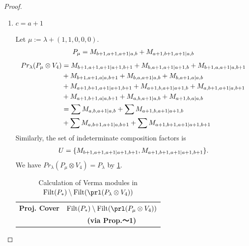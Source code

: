 \begin{proof}
\begin{enumerate}
\begin{enumerate}
        \item $c=a+1$ \par
        Let $\mu:=\lambda + (1,1,0,0,0) $.
        \begin{equation}\notag
          \begin{aligned}
            P_\mu = M_{b+1,a+1,a+1|a,b}
+ M_{a+1,b+1,a+1|a,b}
          \end{aligned}
        \end{equation}
        \begin{equation}\notag
          \begin{aligned}
            Pr_{\lambda}(P_\mu \otimes V_{4}) &=
M_{b+1,a+1,a+1|a+1,b+1}
+ M_{b,a+1,a+1|a+1,b}
+ M_{b+1,a,a+1|a,b+1}\\
                                              &
+ M_{b+1,a+1,a|a,b+1}
+ M_{b,a,a+1|a,b}
+ M_{b,a+1,a|a,b}\\
                                              &
+ M_{a+1,b+1,a+1|a+1,b+1}
+ M_{a+1,b,a+1|a+1,b}
+ M_{a,b+1,a+1|a,b+1}\\
                                              &
+ M_{a+1,b+1,a|a,b+1}
+ M_{a,b,a+1|a,b}
+ M_{a+1,b,a|a,b} \\
                                               &=
\sum M_{a,b,a+1|a,b}
+ \sum M_{a+1,b,a+1|a+1,b}\\
                                              &
+ \sum M_{a,b+1,a+1|a,b+1}
+ \sum M_{a+1,b+1,a+1|a+1,b+1}
          \end{aligned}
        \end{equation}
      Similarly, the set of indeterminate composition factors is 
\begin{equation}\notag
  \begin{aligned}
    U = \{
M_{b+1,a+1,a+1|a+1,b+1},
M_{a+1,b+1,a+1|a+1,b+1}
\}.
  \end{aligned}
\end{equation}
       We have $Pr_{\lambda}(P_\mu \otimes V_{4}) = P_\lambda  $ by \cref{tab:verma-analysis_c_12}.
\begin{table}[htbp]
\centering
\caption{Calculation of Verma modules in $\operatorname{Filt}(P_*) \setminus \operatorname{Filt}(\prl(P_\lambda \otimes V_{4})) $ } \label{tab:verma-analysis_c_12}
\begin{tabular}{cc}
\toprule
\textbf{Proj. Cover} & \textbf{$\operatorname{Filt}(P_*) \setminus \operatorname{Filt}(\prl(P_\mu \otimes V_{4})) $}  \\
     & \textbf{(via Prop.～1)}  \\

\end{tabular}
\end{table}
\end{enumerate}
\end{enumerate}
\end{proof}
